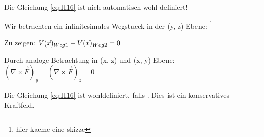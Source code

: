 
Die Gleichung \ref{eq:II16} ist nich automatisch wohl definiert!

Wir betrachten ein infinitesimales Wegstueck in der (y, z) Ebene: \footnote{hier kaeme eine skizze}

Zu zeigen: $V(\vec{x})_{Weg 1} - V(\vec{x})_{Weg 2} = 0 $ 


Durch analoge Betrachtung in (x, z) und (x, y) Ebene: $(\nabla \times \vec{F})_y = (\nabla \times \vec{F})_z = 0$

Die Gleichung \ref{eq:II16} ist wohldefiniert, falls 
. Dies ist ein konservatives Kraftfeld.

